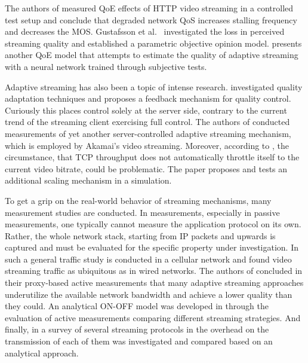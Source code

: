 The authors of \cite{mokmeasuring} measured \gls{QoE} effects of \gls{HTTP} video streaming in a controlled test setup and conclude that degraded network \gls{QoS} increases stalling frequency and decreases the \gls{MOS}. Gustafsson et al.~\cite{gustafsson2008measuring} investigated the loss in perceived streaming quality and established a parametric objective opinion model. \cite{6181070} presents another \gls{QoE} model that attempts to estimate the quality of adaptive streaming with a neural network trained through subjective tests.

Adaptive streaming has also been a topic of intense research. \cite{DeCicco:2011:FCA:1943552.1943573} investigated quality adaptation techniques and proposes a feedback mechanism for quality control. Curiously this places control solely at the server side, contrary to the current trend of the streaming client exercising full control. The authors of \cite{cicco2010akamai} conducted measurements of yet another server-controlled adaptive streaming mechanism, which is employed by Akamai's video streaming. Moreover, according to \cite{5945211}, the circumstance, that \gls{TCP} throughput does not automatically throttle itself to the current video bitrate, could be problematic. The paper proposes and tests an additional scaling mechanism in a simulation.

To get a grip on the real-world behavior of streaming mechanisms, many measurement studies are conducted. In measurements, especially in passive measurements, one typically cannot measure the application protocol on its own. Rather, the whole network stack, starting from \gls{IP} packets and upwards is captured and must be evaluated for the specific property under investigation. In \cite{Erman:2011:OTV:2068816.2068829} such a general traffic study is conducted in a cellular network and found video streaming traffic as ubiquitous as in wired networks. The authors of \cite{Huang:2012:CTU:2398776.2398800} concluded in their proxy-based active measurements that many adaptive streaming approaches underutilize the available network bandwidth and achieve a lower quality than they could. An analytical ON-OFF model was developed in \cite{Rao:2011:NCV:2079296.2079321} through the evaluation of active measurements comparing different streaming strategies. And finally, in a survey of several streaming protocols in \cite{5703713} the overhead on the transmission of each of them was investigated and compared based on an analytical approach. 



